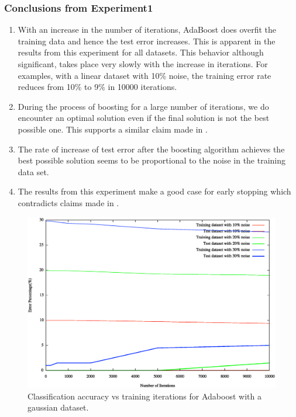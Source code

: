 \documentclass[letterpaper,11pt]{article}
\begin{document}
\subsubsection{Conclusions from Experiment1}
\begin{enumerate}
\item With an increase in the number of iterations, AdaBoost does overfit the training data and hence the test error increases. This is apparent in the results from this experiment for all datasets. This behavior although significant, takes place very slowly with the increase in iterations. For examples, with a linear dataset with 10\% noise, the training error rate reduces from 10\% to 9\% in 10000 iterations. 
\item During the process of boosting for a large number of iterations, we do encounter an optimal solution even if the final solution is not the best possible one. This supports a similar claim made in \cite{Jiang01}.
\item The rate of increase of test error after the boosting algorithm achieves the best possible solution seems to be proportional to the noise in the training data set. 
\item The results from this experiment make a good case for early stopping which contradicts claims made in \cite{MW08}. 
\end{enumerate}

\begin{figure}[H]
  \centering
  \includegraphics[width=140mm]{iterVsAccuracy-gaussian.eps}
  \caption{Classification accuracy vs training iterations for Adaboost with a gaussian dataset.}
  \label{fig:iterVsAccuracygaussian}
\end{figure}
\end{document}
